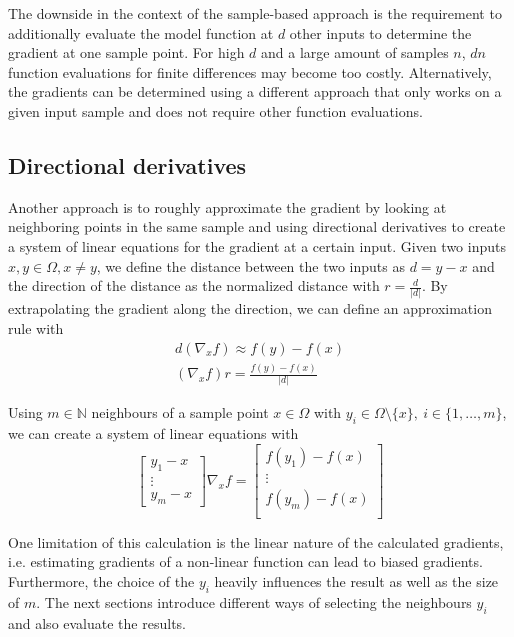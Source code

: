 \documentclass[
  a4paper,  %
  twoside,  %
  bibliography=totoc,
  headsepline,
  cleardoublepage=empty,
  parskip=half,
  draft=false
]{scrbook}
\begin{document}
The downside in the context of the sample-based approach is the requirement to additionally evaluate the model function at $d$ other inputs to determine the gradient at one sample point.
For high $d$ and a large amount of samples $n$, $dn$ function evaluations for finite differences may become too costly.
Alternatively, the gradients can be determined using a different approach that only works on a given input sample and does not require other function evaluations.

\subsection{Directional derivatives}

Another approach is to roughly approximate the gradient by looking at neighboring points in the same sample and using directional derivatives to create a system of linear equations for the gradient at a certain input.
Given two inputs $x, y \in \Omega, x \neq y$, we define the distance between the two inputs as $d=y-x$ and the direction of the distance as the normalized distance with $r=\frac{d}{|d|}$.
By extrapolating the gradient along the direction, we can define an approximation rule with
\begin{equation}
\begin{split}
d (\nabla_x f) \approx f(y) - f(x)\\
(\nabla_x f) r=\frac{f(y) - f(x)}{|d|}
\end{split}
\end{equation}

Using $m \in \mathds{N}$ neighbours of a sample point $x \in \Omega$ with $y_i \in \Omega \setminus \{x\}, ~ i \in \{1, \dots, m\}$, we can create a system of linear equations with
\begin{equation}
\begin{bmatrix}
    y_1 - x\\
    \vdots \\
    y_m - x
  \end{bmatrix}  \nabla_x f =\begin{bmatrix}
    f(y_1) - f(x) \\ \vdots \\  f(y_m) - f(x)
    \\
  \end{bmatrix}
\end{equation}

One limitation of this calculation is the linear nature of the calculated gradients, i.e. estimating gradients of a non-linear function can lead to biased gradients.
Furthermore, the choice of the $y_i$ heavily influences the result as well as the size of $m$.
The next sections introduce different ways of selecting the neighbours $y_i$ and also evaluate the results.
\end{document}
